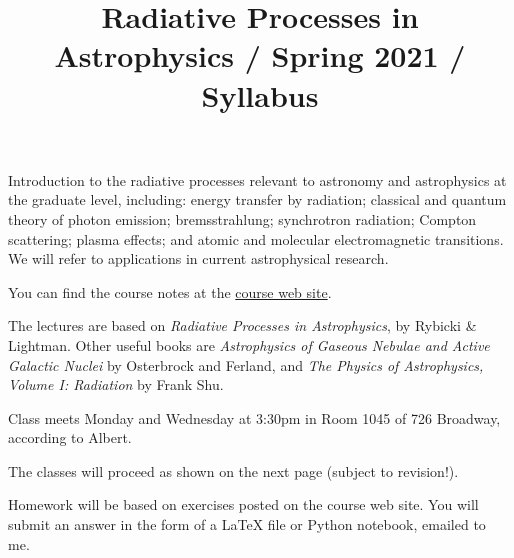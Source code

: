 \documentclass[11pt, preprint]{aastex}
\begin{document}
\title{\bf Radiative Processes in Astrophysics / Spring 2021 / Syllabus }

\noindent Introduction to the radiative processes relevant to astronomy and
astrophysics at the graduate level, including: energy transfer by
radiation; classical and quantum theory of photon emission;
bremsstrahlung; synchrotron radiation; Compton scattering; plasma
effects; and atomic and molecular electromagnetic transitions.  We
will refer to applications in current astrophysical research.

\noindent You can find the course notes at the
\href{http://blanton144.github.io/radiative}{course web site}. 

\noindent The lectures are based on {\it Radiative Processes in
  Astrophysics}, by Rybicki \& Lightman. Other useful books are {\it
  Astrophysics of Gaseous Nebulae and Active Galactic Nuclei} by
Osterbrock and Ferland, and {\it The Physics of Astrophysics, Volume
  I: Radiation} by Frank Shu. 

\noindent Class meets Monday and Wednesday at 3:30pm in Room 1045 of
726 Broadway, according to Albert.

\noindent The classes will proceed as shown on the next page (subject
to revision!).

\noindent 
Homework will be based on exercises posted on the course web site.
You will submit an answer in the form of a LaTeX file or Python
notebook, emailed to me.
\end{document}
